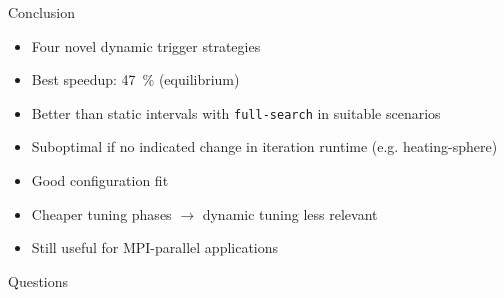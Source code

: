 \begin{frame}[c]{Conclusion}{}
	\begin{itemize}
		\item Four novel dynamic trigger strategies
		\item Best speedup: \qty{47}{\percent} (equilibrium)
		\item Better than static intervals with \texttt{full-search} in suitable scenarios
		\item Suboptimal if no indicated change in iteration runtime (e.g. heating-sphere)
		\item Good configuration fit
		\item Cheaper tuning phases $\rightarrow$ dynamic tuning less relevant
		\item Still useful for MPI-parallel applications
	\end{itemize}
\end{frame}


\begin{frame}[c]{}{}
	\begin{center}
		\LARGE Questions
	\end{center}
\end{frame}

\maketitle


